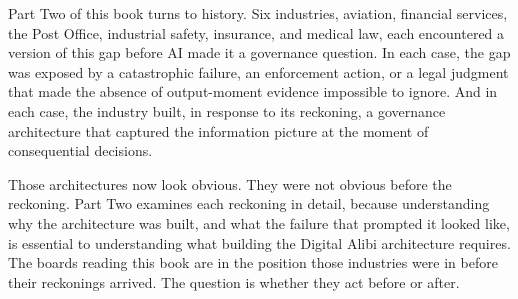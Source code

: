 Part Two of this book turns to history. Six industries, aviation, financial services, the Post Office, industrial safety, insurance, and medical law, each encountered a version of this gap before AI made it a governance question. In each case, the gap was exposed by a catastrophic failure, an enforcement action, or a legal judgment that made the absence of output-moment evidence impossible to ignore. And in each case, the industry built, in response to its reckoning, a governance architecture that captured the information picture at the moment of consequential decisions.

Those architectures now look obvious. They were not obvious before the reckoning. Part Two examines each reckoning in detail, because understanding why the architecture was built, and what the failure that prompted it looked like, is essential to understanding what building the Digital Alibi architecture requires. The boards reading this book are in the position those industries were in before their reckonings arrived. The question is whether they act before or after.

